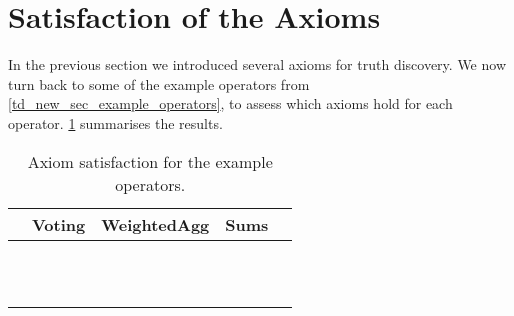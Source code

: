 \section{Satisfaction of the Axioms}
\label{td_new_sec_satisfaction_of_the_axioms}

In the previous section we introduced several axioms for truth discovery. We
now turn back to some of the example operators from
\cref{td_new_sec_example_operators}, to assess which axioms hold for each
operator. \cref{td_new_tab_axiom_satisfaction} summarises the results.

\begin{table}
    \footnotesize
    \centering
    \caption{Axiom satisfaction for the example operators.}
    \def\yes{\checkmark}
    \def\no{\sffamily{X}}
    \begin{tabular}{lcccc}
        &
        Voting             &
        WeightedAgg        &
        Sums               \\

        \toprule

        \claimcoherence{} &
            \yes{} &
            \yes{} &
            \yes{} &
            \\
        \sourcecoherence{} &
            \no{} &
            \no{} &
            \yes{} &
            \\
        \symmetry{} &
            \yes{} &
            \yes{} &
            \yes{} &
            \\
        \freshposresp{} &
            \yes{} &
            \yes{} &
            \no{} &
            \\
        \sourceposresp{} &
            \no{} &
            \yes{} &
            \no{} &
            \\
        \marginaltrustworthiness{} &
            \yes{} &
            \yes{} &
            \yes{} &
            \\
        \trustbasedmon{} &
            \yes{} &
            \yes{} &
            \yes{} &
            \\
        \classicalindependence{} &
            \yes{} &
            \no{} &
            \no{} &
            \\
        \disjointindependence{} &
            \yes{} &
            \yes{} &
            \no{} &
            \\
        \conflictcoherence{} &
            \no{} &
            \no{} &
            \no{} &
            \\
        \anticoherence{} &
            \no{} &
            \no{} &
            \no{} &
            \\

        \bottomrule

	\end{tabular}
    \label{td_new_tab_axiom_satisfaction}
\end{table}

